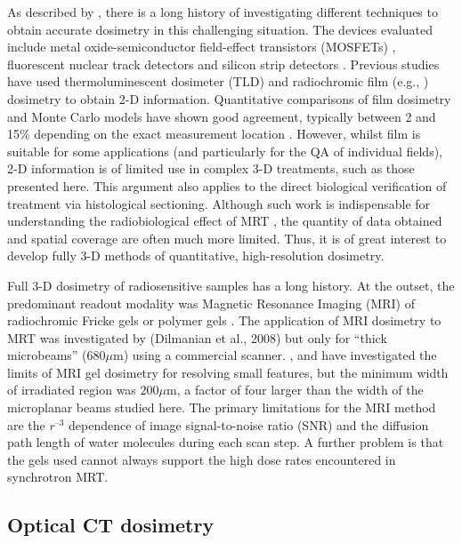 	As described by \cite{brauer-krischpotential2010}, there is a long history of investigating different techniques to obtain accurate dosimetry in this challenging situation. The devices evaluated include metal oxide-semiconductor field-effect transistors (MOSFETs) \cite{brauer2003mosfet, siegbahnmosfet2009}, fluorescent nuclear track detectors \cite{akselrod2006novel} and silicon strip detectors \cite{lerch2011dosimetry}.
	Previous studies have used thermoluminescent dosimeter (TLD) \cite{ptaszkiewicz2008tld} and radiochromic film (e.g., \cite{crosbie2008method, serduchigh-precision2010}) dosimetry to obtain 2-D information. Quantitative comparisons of film dosimetry and Monte Carlo models have shown good agreement, typically between 2 and 15\% depending on the exact measurement location \cite{martinez-roviradevelopment2012}.  However, whilst film is suitable for some applications (and particularly for the QA of individual fields), 2-D information is of limited use in complex 3-D treatments, such as those presented here. This argument also applies to the direct biological verification of treatment via histological sectioning. Although such work is indispensable for understanding the radiobiological effect of MRT \cite{crosbie2010tumor}, the quantity of data obtained and spatial coverage are often much more limited. Thus, it is of great interest to develop fully 3-D methods of quantitative, high-resolution dosimetry.
	
	Full 3-D dosimetry of radiosensitive samples has a long history. At the outset, the predominant readout modality was Magnetic Resonance Imaging (MRI) of radiochromic Fricke gels \cite{appleby1987imaging, schreiner2004review} or polymer gels \cite{baldock2010polymer,maryanski1993nmr}. The application of MRI dosimetry to MRT was investigated by (Dilmanian et al., 2008) but only for “thick microbeams” ($680\mu $m) using a commercial scanner. \cite{berghigh2004}, \cite{bayrederthe2008} and \cite{heilemann2015pushing} have investigated the limits of MRI gel dosimetry for resolving small features, but the minimum width of irradiated region was $200\mu $m, a factor of four larger than the width of the microplanar beams studied here. The primary limitations for the MRI method are the $r^{–3}$ dependence of image signal-to-noise ratio (SNR) and the diffusion path length of water molecules during each scan step. A further problem is that the gels used cannot always support the high dose rates encountered in synchrotron MRT.
	
	\subsection{Optical CT dosimetry}
	

